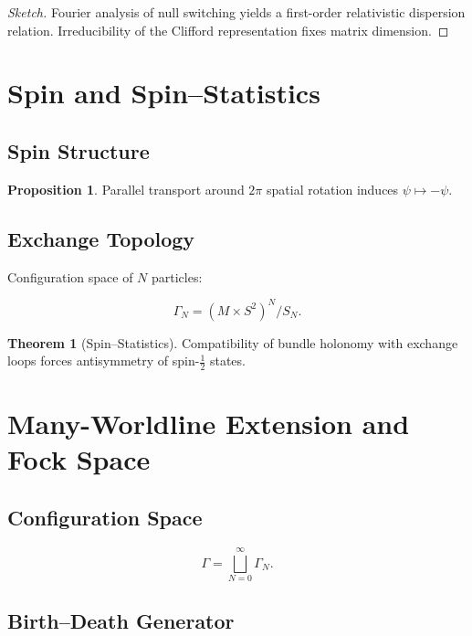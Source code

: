 \documentclass[11pt]{article}
\theoremstyle{definition}
\newtheorem{theorem}[definition]{Theorem}
\newtheorem{proposition}[definition]{Proposition}
\begin{document}
\begin{proof}[Sketch]
Fourier analysis of null switching yields a first-order relativistic
dispersion relation.
Irreducibility of the Clifford representation fixes matrix dimension.
\end{proof}

\section{Spin and Spin--Statistics}

\subsection{Spin Structure}

\begin{proposition}
Parallel transport around $2\pi$ spatial rotation induces
$\psi \mapsto -\psi$.
\end{proposition}

\subsection{Exchange Topology}

Configuration space of $N$ particles:

\[
\Gamma_N = (M\times S^2)^N / S_N.
\]

\begin{theorem}[Spin–Statistics]
Compatibility of bundle holonomy with exchange loops forces
antisymmetry of spin-$\frac12$ states.
\end{theorem}

\section{Many-Worldline Extension and Fock Space}

\subsection{Configuration Space}

\[
\Gamma
=
\bigsqcup_{N=0}^\infty \Gamma_N.
\]

\subsection{Birth–Death Generator}
\end{document}
